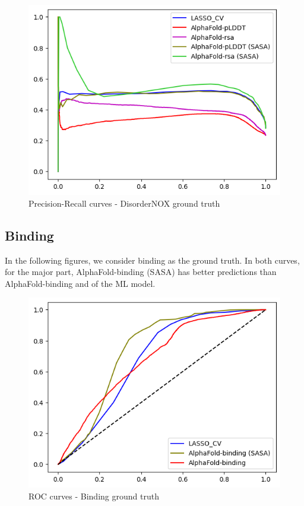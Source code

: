 \begin{figure}[h!]
    \centering
    \includegraphics[scale = 0.73]{res/ML/precisionrecall-disordernox.png}
    \caption{Precision-Recall curves - DisorderNOX ground truth}
\end{figure}

\pagebreak

\subsection{Binding}

In the following figures, we consider binding as the ground truth. In both curves, for the major part, AlphaFold-binding (SASA) has better predictions than AlphaFold-binding and of the ML model. 
\begin{figure}[h!]
    \centering
    \includegraphics[scale = 0.75]{res/ML/roc-binding.png}
    \caption{ROC curves - Binding ground truth}
\end{figure}

